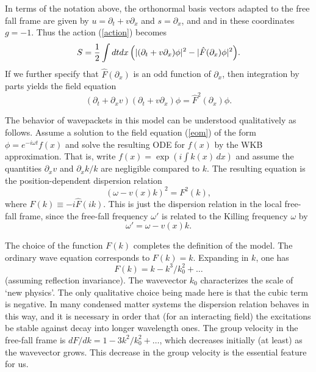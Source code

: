 In terms of the notation above, the orthonormal basis vectors adapted to the
free fall frame
are given by $u=\partial_t+v\partial_x$ and $s=\partial_x$, and
and in these coordinates $g=-1$. Thus the action (\ref{action}) becomes
\begin{equation}
S={1\over2}\int dtdx\,
\Bigl(|(\partial_t+v\partial_x)\phi|^2 -|\hat{F}(\partial_x)\phi|^2\Bigr).
\end{equation}
If we further specify that $\hat{F}(\partial_x)$ is an odd function of
$\partial_x$,
then integration by parts yields the field equation
\begin{equation}
(\partial_t+\partial_x
v)(\partial_t+v\partial_x)\phi=\hat{F}^2(\partial_x)\phi.
\label{eom}
\end{equation}

The behavior of wavepackets in this model can be understood
qualitatively as follows.  Assume a solution to the field equation
(\ref{eom}) of the form $\phi = e^{-i \omega t} f(x)$ and solve the
resulting ODE for $f(x)$ by the WKB approximation. That is, write $f(x)
= \exp(i\int k(x)\,dx)$ and assume the quantities $\partial_x v$ and
$\partial_x k/k$ are negligible compared to $k$.  The resulting
equation is the position-dependent dispersion relation
\begin{equation}
(\omega - v(x)k)^{2} = F^{2}(k),
\label{disp'}
\end{equation}
where $F(k)\equiv-i\hat{F}(ik)$.
This is just the dispersion relation in the local free-fall frame, since the 
free-fall frequency $\omega'$ is related to the Killing frequency $\omega$ by
\begin{equation}
\omega'=\omega-v(x)k.
\label{otrans}
\end{equation}

The choice of the function $F(k)$ completes the definition of the model. The
ordinary wave equation corresponds to $F(k)=k$.  Expanding in $k$, one has
\begin{equation}
F(k)=k-k^3/k_0^2+\dots
\end{equation}
(assuming reflection invariance). The wavevector $k_0$ characterizes
the scale of `new physics'. The only qualitative choice being made here
is that the cubic term is negative. In many condensed matter systems
the dispersion relation behaves in this way, and it is necessary in
order that (for an interacting field) the excitations be stable against
decay into longer wavelength ones\cite{Pita59}. The group velocity in
the free-fall frame is $dF/dk=1-3k^2/k_0^2+\dots$, which decreases
initially (at least) as the wavevector grows. This decrease in the
group velocity is the essential feature for us.

